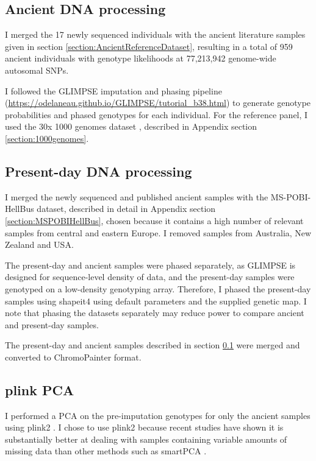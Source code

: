\subsection{Ancient DNA processing} \label{AncientDNAprocessing}

I merged the 17 newly sequenced individuals with the ancient literature samples given in section \ref{section:AncientReferenceDataset}, resulting in a total of 959 ancient individuals with genotype likelihoods at 77,213,942 genome-wide autosomal SNPs. 

I followed the GLIMPSE \cite{rubinacci2021efficient} imputation and phasing pipeline (\url{https://odelaneau.github.io/GLIMPSE/tutorial_b38.html}) to generate genotype probabilities and phased genotypes for each individual. For the reference panel, I used the 30x 1000 genomes dataset \cite{byrska2021high}, described in Appendix section \ref{section:1000genomes}.  

\subsection{Present-day DNA processing} \label{PresentdayDNAprocessing}

I  merged the newly sequenced and published ancient samples with the MS-POBI-HellBus dataset, described in detail in Appendix section \ref{section:MSPOBIHellBus}, chosen because it contains a high number of relevant samples from central and eastern Europe. I removed samples from Australia, New Zealand and USA.

The present-day and ancient samples were phased separately, as GLIMPSE is designed for sequence-level density of data, and the present-day samples were genotyped on a low-density genotyping array. Therefore, I phased the present-day samples using shapeit4 \cite{delaneau2018integrative} using default parameters and the supplied genetic map. I note that phasing the datasets separately may reduce power to compare ancient and present-day samples. 

The present-day and ancient samples described in section \ref{AncientDNAprocessing} were merged and converted to ChromoPainter format.

\subsection{plink PCA}

I performed a PCA on the pre-imputation genotypes for only the ancient samples using plink2 \cite{chang2015second}. I chose to use plink2 because recent studies have shown it is substantially better at dealing with samples containing variable amounts of missing data than other methods such as smartPCA \cite{AlbrechtsenPCAmissingness}.

